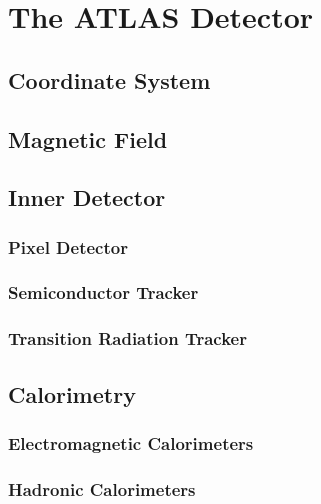 \chapter{The ATLAS Detector}

\label{ch:atlas}

\section{Coordinate System}


\section{Magnetic Field}


\section{Inner Detector}

\subsection{Pixel Detector}
\label{sec:pixel}

\subsection{Semiconductor Tracker}

\subsection{Transition Radiation Tracker}


\section{Calorimetry}

\subsection{Electromagnetic Calorimeters}

\subsection{Hadronic Calorimeters}


